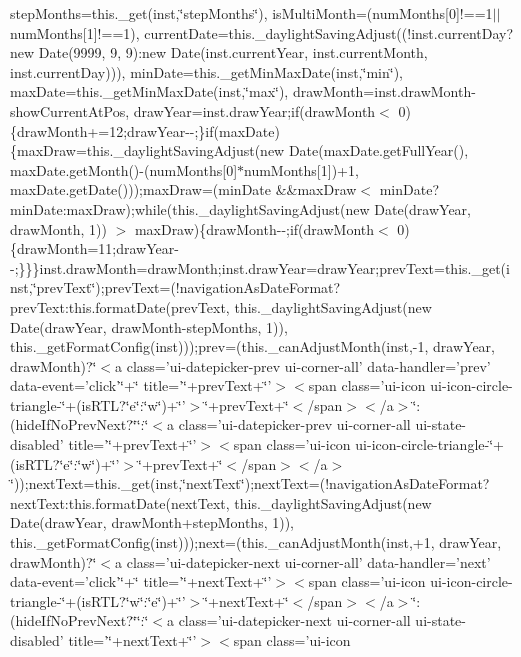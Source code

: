 {{\begin{DoxyParamCaption}
step\+Months=this.\+\_\+get(inst,\char`\"{}step\+Months\char`\"{}), is\+Multi\+Month=(num\+Months\mbox{[}0\mbox{]}!==1$\vert$$\vert$num\+Months\mbox{[}1\mbox{]}!==1), current\+Date=this.\+\_\+daylight\+Saving\+Adjust((!inst.\+current\+Day?new Date(9999, 9, 9)\+:new Date(inst.\+current\+Year, inst.\+current\+Month, inst.\+current\+Day))), min\+Date=this.\+\_\+get\+Min\+Max\+Date(inst,\char`\"{}min\char`\"{}), max\+Date=this.\+\_\+get\+Min\+Max\+Date(inst,\char`\"{}max\char`\"{}), draw\+Month=inst.\+draw\+Month-\/show\+Current\+At\+Pos, draw\+Year=inst.\+draw\+Year;if(draw\+Month$<$ 0)\{draw\+Month+=12;draw\+Year-\/-\/;\}if(max\+Date)\{max\+Draw=this.\+\_\+daylight\+Saving\+Adjust(new Date(max\+Date.\+get\+Full\+Year(), max\+Date.\+get\+Month()-\/(num\+Months\mbox{[}0\mbox{]}$\ast$num\+Months\mbox{[}1\mbox{]})+1, max\+Date.\+get\+Date()));max\+Draw=(min\+Date \&\&max\+Draw$<$ min\+Date?min\+Date\+:max\+Draw);while(this.\+\_\+daylight\+Saving\+Adjust(new Date(draw\+Year, draw\+Month, 1)) $>$ max\+Draw)\{draw\+Month-\/-\/;if(draw\+Month$<$ 0)\{draw\+Month=11;draw\+Year-\/-\/;\}\}\}inst.\+draw\+Month=draw\+Month;inst.\+draw\+Year=draw\+Year;prev\+Text=this.\+\_\+get(inst,\char`\"{}prev\+Text\char`\"{});prev\+Text=(!navigation\+As\+Date\+Format?prev\+Text\+:this.\+format\+Date(prev\+Text, this.\+\_\+daylight\+Saving\+Adjust(new Date(draw\+Year, draw\+Month-\/step\+Months, 1)), this.\+\_\+get\+Format\+Config(inst)));prev=(this.\+\_\+can\+Adjust\+Month(inst,-\/1, draw\+Year, draw\+Month)?\char`\"{}$<$a class='ui-\/datepicker-\/prev ui-\/corner-\/all' data-\/handler='prev' data-\/event='click'\char`\"{}+\char`\"{} title='\char`\"{}+prev\+Text+\char`\"{}'$>$$<$span class='ui-\/icon ui-\/icon-\/circle-\/triangle-\/\char`\"{}+(is\+R\+T\+L?\char`\"{}e\char`\"{}\+:\char`\"{}w\char`\"{})+\char`\"{}'$>$\char`\"{}+prev\+Text+\char`\"{}$<$/span$>$$<$/a$>$\char`\"{}\+:(hide\+If\+No\+Prev\+Next?\char`\"{}\char`\"{}\+:\char`\"{}$<$a class='ui-\/datepicker-\/prev ui-\/corner-\/all ui-\/state-\/disabled' title='\char`\"{}+prev\+Text+\char`\"{}'$>$$<$span class='ui-\/icon ui-\/icon-\/circle-\/triangle-\/\char`\"{}+(is\+R\+T\+L?\char`\"{}e\char`\"{}\+:\char`\"{}w\char`\"{})+\char`\"{}'$>$\char`\"{}+prev\+Text+\char`\"{}$<$/span$>$$<$/a$>$\char`\"{}));next\+Text=this.\+\_\+get(inst,\char`\"{}next\+Text\char`\"{});next\+Text=(!navigation\+As\+Date\+Format?next\+Text\+:this.\+format\+Date(next\+Text, this.\+\_\+daylight\+Saving\+Adjust(new Date(draw\+Year, draw\+Month+step\+Months, 1)), this.\+\_\+get\+Format\+Config(inst)));next=(this.\+\_\+can\+Adjust\+Month(inst,+1, draw\+Year, draw\+Month)?\char`\"{}$<$a class='ui-\/datepicker-\/next ui-\/corner-\/all' data-\/handler='next' data-\/event='click'\char`\"{}+\char`\"{} title='\char`\"{}+next\+Text+\char`\"{}'$>$$<$span class='ui-\/icon ui-\/icon-\/circle-\/triangle-\/\char`\"{}+(is\+R\+T\+L?\char`\"{}w\char`\"{}\+:\char`\"{}e\char`\"{})+\char`\"{}'$>$\char`\"{}+next\+Text+\char`\"{}$<$/span$>$$<$/a$>$\char`\"{}\+:(hide\+If\+No\+Prev\+Next?\char`\"{}\char`\"{}\+:\char`\"{}$<$a class='ui-\/datepicker-\/next ui-\/corner-\/all ui-\/state-\/disabled' title='\char`\"{}+next\+Text+\char`\"{}'$>$$<$span class='ui-\/icon 
\end{DoxyParamCaption}}}
